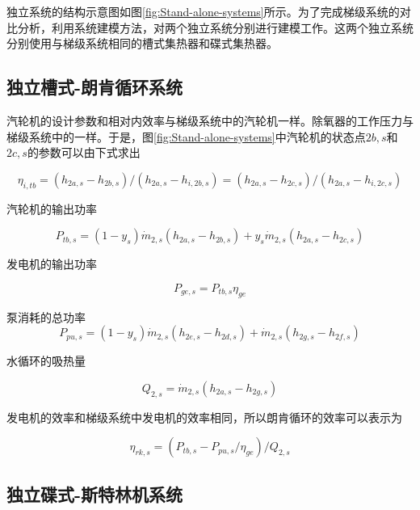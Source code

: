 独立系统的结构示意图如图\ref{fig:Stand-alone-systems}所示。为了完成梯级系统的对比分析，利用系统建模方法，对两个独立系统分别进行建模工作。这两个独立系统分别使用与梯级系统相同的槽式集热器和碟式集热器。

\subsection{独立槽式-朗肯循环系统}

汽轮机的设计参数和相对内效率与梯级系统中的汽轮机一样。除氧器的工作压力与梯级系统中的一样。于是，图\ref{fig:Stand-alone-systems}中汽轮机的状态点$2b,s$和$2c,s$的参数可以由下式求出

\begin{equation}
	\eta_{i,tb}= (h_{2a,s}-h_{2b,s})/(h_{2a,s}-h_{i,2b,s}) = (h_{2a,s}-h_{2c,s})/(h_{2a,s}-h_{i,2c,s})
\end{equation}

汽轮机的输出功率

\begin{equation}
	P_{tb,s}=\left(1-y_{s}\right)\dot{m}_{2,s}\left(h_{2a,s}-h_{2b,s}\right)+y_{s}\dot{m}_{2,s}\left(h_{2a,s}-h_{2c,s}\right)
\end{equation}

发电机的输出功率

\begin{equation}
	P_{ge,s}=P_{tb,s}\eta_{ge}
\end{equation}

泵消耗的总功率
\begin{equation}
	P_{pu,s}=\left(1-y_{s}\right)\dot{m}_{2,s}\left(h_{2e,s}-h_{2d,s}\right)+\dot{m}_{2,s}\left(h_{2g,s}-h_{2f,s}\right)
\end{equation}

水循环的吸热量

\begin{equation}
	Q_{2,s}=\dot{m}_{2,s}\left(h_{2a,s}-h_{2g,s}\right)
\end{equation}

发电机的效率和梯级系统中发电机的效率相同，所以朗肯循环的效率可以表示为

\begin{equation}
	\eta_{rk,s}=(P_{tb,s}-P_{pu,s}/\eta_{ge})/Q_{2,s}
\end{equation}

\subsection{独立碟式-斯特林机系统}

